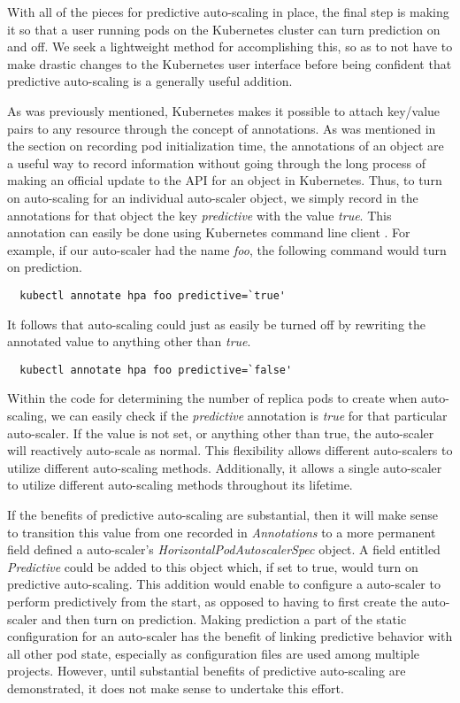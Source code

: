 With all of the pieces for predictive auto-scaling in place, the final step is
making it so that a user running pods on the Kubernetes cluster can turn
prediction on and off. We seek a lightweight method for accomplishing this, so
as to not have to make drastic changes to the Kubernetes user interface before
being confident that predictive auto-scaling is a generally useful addition.

As was previously mentioned, Kubernetes makes it
possible to attach key/value pairs to any
resource through the concept of annotations. As was mentioned in the section on
recording pod initialization time, the annotations of an object are a useful way
to record information without going through the long process of making an
official update to the API for an object in Kubernetes. Thus, to turn on
auto-scaling for an individual auto-scaler object, we simply record in the annotations for
that object the key \textit{predictive} with the value \textit{true}. This
annotation can easily be done using Kubernetes command line
client \cite{k8s-kubectl-annotate}. For example,
if our auto-scaler had the name \textit{foo}, the following command would turn
on prediction.

\begin{verbatim}
  kubectl annotate hpa foo predictive=`true'
\end{verbatim}

It follows that auto-scaling could just as easily be turned off by rewriting the
annotated value to anything other than \textit{true}.

\begin{verbatim}
  kubectl annotate hpa foo predictive=`false'
\end{verbatim}

Within the code for determining the number of replica pods to create when
auto-scaling, we can easily check if the \textit{predictive} annotation is
\textit{true} for that particular auto-scaler. If the value is not set, or
anything other than true, the auto-scaler will reactively auto-scale as normal.
This flexibility allows different auto-scalers to utilize different auto-scaling
methods. Additionally, it allows a single auto-scaler to utilize different
auto-scaling methods throughout its lifetime.

If the benefits of predictive auto-scaling are substantial, then it will make
sense to transition this value from one recorded in \textit{Annotations} to a
more permanent field defined a auto-scaler's
\textit{HorizontalPodAutoscalerSpec} object. A field entitled
\textit{Predictive} could be added to this object which, if set to true, would
turn on predictive auto-scaling. This addition would enable to configure a
auto-scaler to perform predictively from the start, as opposed to having to first
create the auto-scaler and then turn on prediction. Making prediction a part of
the static configuration for an auto-scaler has the benefit of linking predictive
behavior with all other pod state, especially as configuration files are used
among multiple projects. However, until substantial benefits of predictive
auto-scaling are demonstrated, it does not make sense to undertake this effort.

